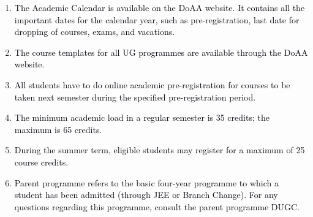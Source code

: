 \documentclass[12pt]{article}
\begin{document}
\vspace{\baselineskip}
\begin{enumerate}[label*={\fontsize{10pt}{10pt}\selectfont \arabic*.}]
	\item {\fontsize{10pt}{12.0pt}\selectfont \textcolor[HTML]{00000A}{The Academic Calendar is available on the DoAA website. It contains all the important dates for the calendar year, such as pre-registration, last date for dropping of courses, exams, and vacations.}\par}\par


\vspace{\baselineskip}
	\item {\fontsize{10pt}{12.0pt}\selectfont \textcolor[HTML]{00000A}{The course templates for all UG programmes are available through the DoAA website.}\par}\par


\vspace{\baselineskip}
	\item {\fontsize{10pt}{12.0pt}\selectfont \textcolor[HTML]{00000A}{All students have to do online academic pre-registration for courses to be taken next semester during the specified pre-registration period.}\par}\par


\vspace{\baselineskip}
	\item {\fontsize{10pt}{12.0pt}\selectfont \textcolor[HTML]{00000A}{The minimum academic load in a regular semester is 35 credits; the maximum is 65 credits.}\par}\par


\vspace{\baselineskip}
	\item {\fontsize{10pt}{12.0pt}\selectfont \textcolor[HTML]{00000A}{During the summer term, eligible students may register for a maximum of 25 course credits.}\par}\par


\vspace{\baselineskip}
	\item {\fontsize{9pt}{10.8pt}\selectfont \textcolor[HTML]{00000A}{Parent programme refers to the basic four-year programme to which a student has been admitted (through JEE or Branch Change). For any questions regarding this programme, consult the parent programme DUGC.}\par}\par



\end{enumerate}
\end{document}

